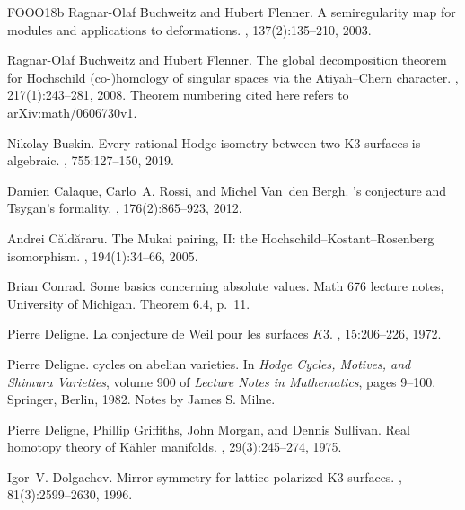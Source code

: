 \documentclass[11pt]{article}
\numberwithin{equation}{section}
\theoremstyle{definition}
\theoremstyle{remark}
\begin{document}
\begin{thebibliography}{FOOO18b}
Ragnar-Olaf Buchweitz and Hubert Flenner.
\newblock A semiregularity map for modules and applications to deformations.
, 137(2):135--210, 2003.

Ragnar-Olaf Buchweitz and Hubert Flenner.
\newblock The global decomposition theorem for {Hochschild} (co-)homology of
  singular spaces via the {Atiyah--Chern} character.
, 217(1):243--281, 2008.
\newblock Theorem numbering cited here refers to arXiv:math/0606730v1.

Nikolay Buskin.
\newblock Every rational {Hodge} isometry between two {K3} surfaces is
  algebraic.
,
  755:127--150, 2019.

Damien Calaque, Carlo~A. Rossi, and Michel Van~den Bergh.
's conjecture and {Tsygan}'s formality.
, 176(2):865--923, 2012.

Andrei C\u{a}ld\u{a}raru.
\newblock The {Mukai} pairing, {II}: the {Hochschild--Kostant--Rosenberg}
  isomorphism.
, 194(1):34--66, 2005.

Brian Conrad.
\newblock Some basics concerning absolute values.
\newblock Math 676 lecture notes, University of Michigan.
\newblock Theorem 6.4, p.~11.

Pierre Deligne.
\newblock La conjecture de {Weil} pour les surfaces {$K3$}.
, 15:206--226, 1972.

Pierre Deligne.
 cycles on abelian varieties.
\newblock In {\em {Hodge} Cycles, Motives, and {Shimura} Varieties}, volume 900
  of {\em Lecture Notes in Mathematics}, pages 9--100. Springer, Berlin, 1982.
\newblock Notes by James S. Milne.

Pierre Deligne, Phillip Griffiths, John Morgan, and Dennis Sullivan.
\newblock Real homotopy theory of {K{\"a}hler} manifolds.
, 29(3):245--274, 1975.

Igor~V. Dolgachev.
\newblock Mirror symmetry for lattice polarized {K3} surfaces.
, 81(3):2599--2630, 1996.


\end{thebibliography}
\end{document}
